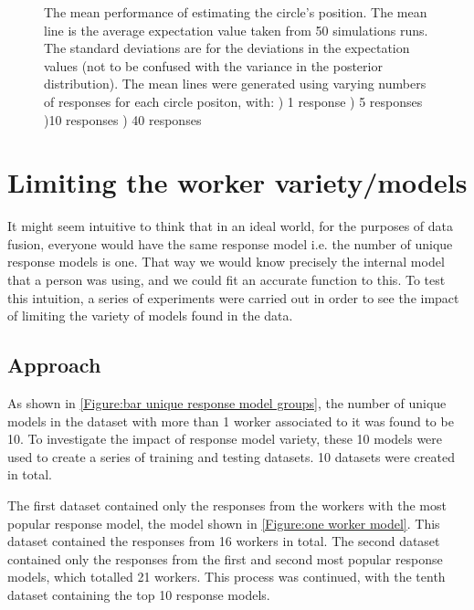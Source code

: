 \begin{figure}
\begin{subfigure}{6cm}
\caption{}
\label{Figure: response_estimate_40}
\end{subfigure}
\caption{The mean performance of estimating the circle's position. The mean line is the average expectation value taken from 50 simulations runs. The standard deviations are for the deviations in the expectation values (not to be confused with the variance in the posterior distribution). The mean lines were generated using varying numbers of responses for each circle positon, with: ) 1 response ) 5 responses )10 responses ) 40 responses}
\label{Figure: response_estimate}
\end{figure}





\section{Limiting the worker variety/models}

It might seem intuitive to think that in an ideal world, for the purposes of data fusion, everyone would have the same response model i.e. the number of unique response models is one. 
That way we would know precisely the internal model that a person was using, and we could fit an accurate function to this. 
To test this intuition, a series of experiments were carried out in order to see the impact of limiting the variety of models found in the data. 

\subsection{Approach}

As shown in \ref{Figure:bar unique response model groups}, the number of unique models in the dataset with more than 1 worker associated to it was found to be 10. 
To investigate the impact of response model variety, these 10 models were used to create a series of training and testing datasets. 
10 datasets were created in total.

The first dataset contained only the responses from the workers with the most popular response model, the model shown in \ref{Figure:one worker model}. 
This dataset contained the responses from 16 workers in total. 
The second dataset contained only the responses from the first and second most popular response models, which totalled 21 workers. 
This process was continued, with the tenth dataset containing the top 10 response models.

